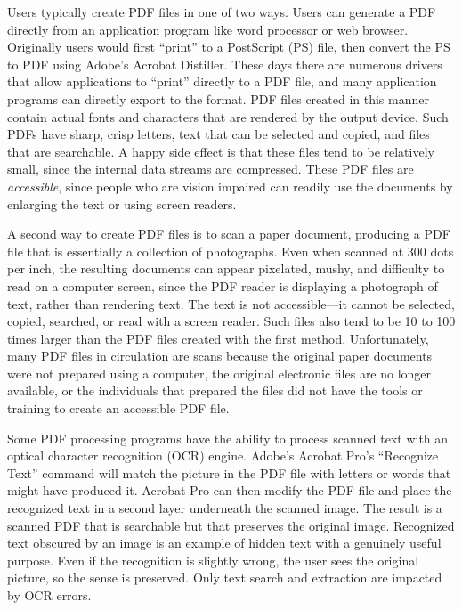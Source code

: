 Users typically create PDF files in one of two ways. Users can
generate a PDF directly from an application program like word
processor or web browser.  Originally users would first ``print'' to a
PostScript (PS) file, then convert the PS to PDF using Adobe's
Acrobat Distiller. These days there are numerous drivers that allow
applications to ``print'' directly to a PDF file, and many application
programs can directly export to the format. PDF files created in this
manner contain actual fonts and characters that are rendered by the
output device. Such PDFs have sharp, crisp letters, text that can be
selected and copied, and files that are searchable. A happy side
effect is that these files tend to be relatively small, since the
internal data streams are compressed. These PDF files are 
\emph{accessible}, since people who are vision impaired can readily use
the documents by enlarging the text or using screen readers.

A second way to create PDF files is to scan a paper
document, producing a PDF file that is essentially a collection of
photographs. Even when scanned at 300 dots per inch, the
resulting documents can appear pixelated, mushy, and difficulty to read on a
computer screen, since the PDF reader is displaying a photograph of text,
rather than rendering text. The
text is not accessible---it cannot be selected, copied, searched, or
read with a screen reader. Such files also tend to be 10 to 100 times
larger than the PDF files created with the first
method. Unfortunately, many PDF files in circulation are scans because
the original paper documents were not prepared using a computer,
the original electronic files are no longer  available, or the
individuals that prepared the files did not have the tools or 
training to create an accessible PDF file.

Some PDF processing programs have the ability to process scanned text
with an optical character recognition (OCR) engine. Adobe's Acrobat
Pro's ``Recognize Text'' command will match  the picture in
the PDF file with letters or words that might have produced
it. Acrobat Pro can then modify the PDF file and place the recognized
text in a second layer underneath the scanned image. The result is a
scanned PDF  that is searchable but that preserves the
original image. Recognized text obscured by an image is an example of hidden text with
a genuinely useful purpose. Even if the recognition is slightly wrong, the
user sees the original picture, so the sense is preserved. Only text
search and extraction are impacted by OCR errors.

